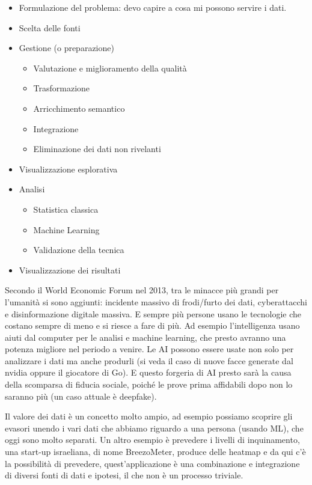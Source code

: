 \documentclass[a4page, 11pt]{article}
\begin{document}
\begin{itemize}
	\item
	Formulazione del problema: devo capire a cosa mi possono servire i
	dati.
	\item
	Scelta delle fonti
	\item
	Gestione (o preparazione)
	
	\begin{itemize}
		 
		\item
		Valutazione e miglioramento della qualità
		\item
		Trasformazione
		\item
		Arricchimento semantico
		\item
		Integrazione
		\item
		Eliminazione dei dati non rivelanti
	\end{itemize}
	\item
	Visualizzazione esplorativa
	\item
	Analisi
	
	\begin{itemize}
		 
		\item
		Statistica classica
		\item
		Machine Learning
		\item
		Validazione della tecnica
	\end{itemize}
	\item
	Visualizzazione dei risultati
\end{itemize}

Secondo il World Economic Forum nel 2013, tra le minacce più grandi per
l'umanità si sono aggiunti: incidente massivo di frodi/furto dei dati,
cyberattacchi e disinformazione digitale massiva. E sempre più persone
usano le tecnologie che costano sempre di meno e si riesce a fare di
più. Ad esempio l'intelligenza usano aiuti dal computer per le analisi e
machine learning, che presto avranno una potenza migliore nel periodo a
venire. Le AI possono essere usate non solo per analizzare i dati ma
anche produrli (si veda il caso di nuove facce generate dal nvidia
oppure il giocatore di Go). E questo forgeria di AI presto sarà la causa
della scomparsa di fiducia sociale, poiché le prove prima affidabili
dopo non lo saranno più (un caso attuale è deepfake).

Il valore dei dati è un concetto molto ampio, ad esempio possiamo
scoprire gli evasori unendo i vari dati che abbiamo riguardo a una
persona (usando ML), che oggi sono molto separati. Un altro esempio è
prevedere i livelli di inquinamento, una start-up israeliana, di nome
BreezoMeter, produce delle heatmap e da qui c'è la possibilità di
prevedere, quest'applicazione è una combinazione e integrazione di
diversi fonti di dati e ipotesi, il che non è un processo triviale.
\end{document}
